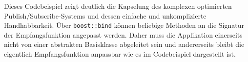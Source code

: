 

Dieses Codebeispiel zeigt deutlich die Kapselung des komplexen optimierten Publish/Subscribe-Systems und dessen einfache und unkomplizierte Handhabbarkeit. Über \texttt{boost::bind} können beliebige Methoden an die Signatur der Empfangsfunktion angepasst werden. Daher muss die Applikation einerseits nicht von einer abstrakten Basisklasse abgeleitet sein und andererseits bleibt die eigentlich Empfangsfunktion anpassbar wie es im Codebeispiel dargestellt ist.
